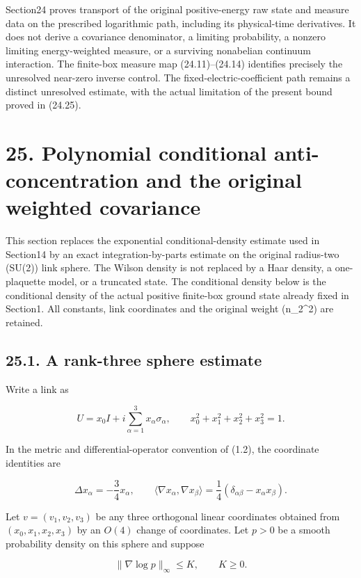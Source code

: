 \documentclass[
]{article}
\begin{document}
Section24 proves transport of the original positive-energy raw state and
measure data on the prescribed logarithmic path, including its
physical-time derivatives. It does not derive a covariance denominator,
a limiting probability, a nonzero limiting energy-weighted measure, or a
surviving nonabelian continuum interaction. The finite-box measure map
(24.11)--(24.14) identifies precisely the unresolved near-zero inverse
control. The fixed-electric-coefficient path remains a distinct
unresolved estimate, with the actual limitation of the present bound
proved in (24.25).

\section{25. Polynomial conditional anti-concentration and the original
weighted
covariance}\label{polynomial-conditional-anti-concentration-and-the-original-weighted-covariance}

This section replaces the exponential conditional-density estimate used
in Section14 by an exact integration-by-parts estimate on the original
radius-two (SU(2)) link sphere. The Wilson density is not replaced by a
Haar density, a one-plaquette model, or a truncated state. The
conditional density below is the conditional density of the actual
positive finite-box ground state already fixed in Section1. All
constants, link coordinates and the original weight (n\_2\^{}2) are
retained.

\subsection{25.1. A rank-three sphere
estimate}\label{a-rank-three-sphere-estimate}

Write a link as

\[
 U=x_0 I+i\sum_{\alpha=1}^3x_\alpha\sigma_\alpha,
 \qquad x_0^2+x_1^2+x_2^2+x_3^2=1.
\]

In the metric and differential-operator convention of (1.2), the
coordinate identities are

\[
 \Delta x_\alpha=-\frac34x_\alpha,
 \qquad
 \langle\nabla x_\alpha,\nabla x_\beta\rangle
 =\frac14(\delta_{\alpha\beta}-x_\alpha x_\beta).
 \tag{25.1}
\]

Let \(v=(v_1,v_2,v_3)\) be any three orthogonal linear coordinates
obtained from \((x_0,x_1,x_2,x_3)\) by an \(O(4)\) change of
coordinates. Let \(p>0\) be a smooth probability density on this sphere
and suppose

\[
 \|\nabla\log p\|_\infty\le K,
 \qquad K\ge0.
 \tag{25.2}
\]
\end{document}
